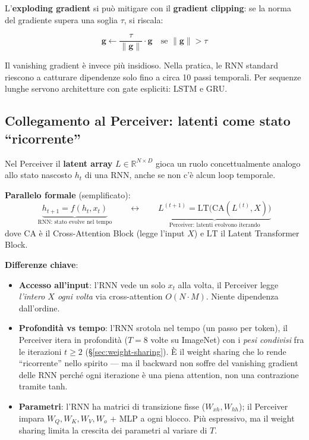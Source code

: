 \documentclass[
  11pt,
]{article}
\begin{document}
L'\textbf{exploding gradient} si può mitigare con il \textbf{gradient clipping}: se la norma del gradiente supera una soglia $\tau$, si riscala:
\begin{formulabox}[title={\textbf{Gradient Clipping}}]
\[
\mathbf{g} \leftarrow \frac{\tau}{\|\mathbf{g}\|} \cdot \mathbf{g} \quad \text{se } \|\mathbf{g}\| > \tau
\]
\end{formulabox}

Il vanishing gradient è invece più insidioso. Nella pratica, le RNN standard riescono a catturare dipendenze solo fino a circa 10 passi temporali. Per sequenze lunghe servono architetture con gate espliciti: LSTM e GRU.

\subsection{Collegamento al Perceiver: latenti come stato ``ricorrente''}

Nel Perceiver il \textbf{latent array} $L \in \mathbb{R}^{N \times D}$ gioca un ruolo concettualmente analogo allo stato nascosto $h_t$ di una RNN, anche se non c'è alcun loop temporale.

\textbf{Parallelo formale} (semplificato):
\[
\underbrace{h_{t+1} = f(h_t, x_t)}_{\text{RNN: stato evolve nel tempo}}
\qquad \longleftrightarrow \qquad
\underbrace{L^{(t+1)} = \mathrm{LT}\!\bigl(\mathrm{CA}(L^{(t)}, X)\bigr)}_{\text{Perceiver: latenti evolvono iterando}}
\]
dove $\mathrm{CA}$ è il Cross-Attention Block (legge l'input $X$) e $\mathrm{LT}$ il Latent Transformer Block.

\textbf{Differenze chiave}:
\begin{itemize}\setlength\itemsep{0.15em}
\item \textbf{Accesso all'input}: l'RNN vede un solo $x_t$ alla volta, il Perceiver legge \emph{l'intero $X$ ogni volta} via cross-attention $O(N \cdot M)$. Niente dipendenza dall'ordine.
\item \textbf{Profondità vs tempo}: l'RNN srotola nel tempo (un passo per token), il Perceiver itera in profondità ($T = 8$ volte su ImageNet) con i \emph{pesi condivisi} fra le iterazioni $t \geq 2$ (\S\ref{sec:weight-sharing}). È il weight sharing che lo rende ``ricorrente'' nello spirito --- ma il backward non soffre del vanishing gradient delle RNN perché ogni iterazione è una piena attention, non una contrazione tramite tanh.
\item \textbf{Parametri}: l'RNN ha matrici di transizione fisse ($W_{xh}, W_{hh}$); il Perceiver impara $W_Q, W_K, W_V, W_o$ + MLP a ogni blocco. Più espressivo, ma il weight sharing limita la crescita dei parametri al variare di $T$.
\end{itemize}
\end{document}
